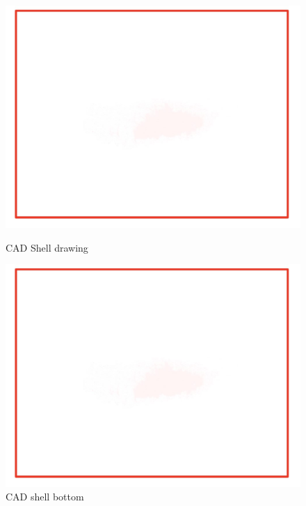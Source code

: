 \begin{figure}[!ht]
  \centering
  \begin{minipage}[b]{0.45\linewidth}
    \includegraphics[width=\linewidth]{texfiles/mech/eimg/aerodynamics/shell_drawing}
    \caption{CAD Shell drawing }
    \label{fig:shell_drawing}
  \end{minipage}
  \hspace{0.5cm}
  \begin{minipage}[b]{0.45\linewidth}
    \includegraphics[width=\linewidth]{texfiles/mech/eimg/aerodynamics/shell_bottom}
    \caption{CAD shell bottom}
    \label{fig:shell_bottom}
  \end{minipage}
\end{figure}
\par %

